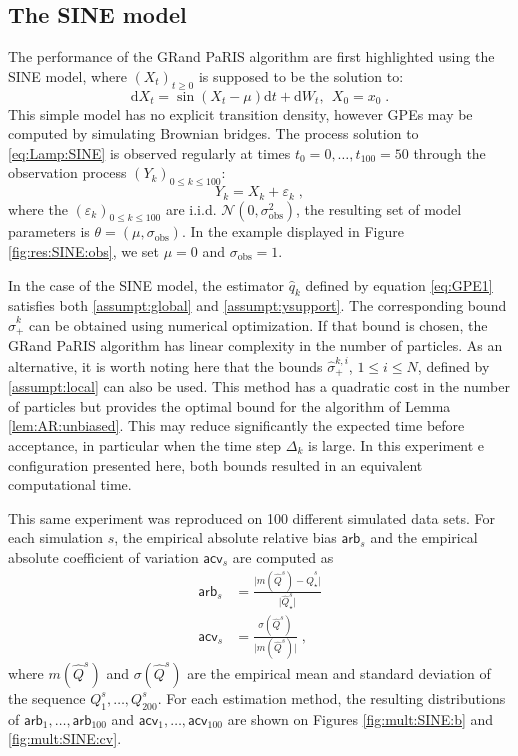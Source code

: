 \documentclass[12pt]{article}
\newcommand{\rmd}{\mathrm{d}}
\newcommand{\eqsp}{\;}
\newcommand{\1}{\mathrm{1}}
\newcommand{\hQ}{\widehat{Q}}
\begin{document}
\subsection*{The SINE model} 
The performance of the GRand PaRIS algorithm are first highlighted using the SINE model, where $(X_t)_{t\geq 0}$ is supposed to be the solution to: 
\begin{equation}
\rmd X_t = \sin \left(X_t-\mu\right)\rmd t + \rmd W_t,~~X_0=x_0\eqsp. \label{eq:Lamp:SINE}
\end{equation}
This simple model has no explicit transition density, however GPEs may be computed by simulating Brownian bridges.
The process solution to \eqref{eq:Lamp:SINE} is observed regularly at times $t_0=0,\ldots,t_{100}=50$ through the observation process $(Y_k)_{0\leq k \leq 100}$:
\begin{equation*}
Y_k = X_k + \varepsilon_k\eqsp,
\end{equation*}
where the $(\varepsilon_k)_{0\leq k \leq 100}$ are i.i.d. $\mathcal{N}(0, \sigma^2_\text{obs})$, the resulting set of model parameters is $\theta = (\mu, \sigma_\text{obs})$.
In the example displayed in Figure \ref{fig:res:SINE:obs}, we set $\mu=0$ and $ \sigma_\text{obs} = 1$.


In the case of the SINE model, the estimator $\widehat{q}_k$ defined by equation \eqref{eq:GPE1} satisfies both \eqref{assumpt:global} and \eqref{assumpt:ysupport}. The corresponding bound $\widehat{\sigma}_+^k$ can be obtained using numerical optimization. 
If that bound is chosen, the GRand PaRIS algorithm has linear complexity in the number of particles. 
As an alternative, it is worth noting here that the bounds $\widehat{\sigma}_+^{k,i}$, $1\le i \le N$, defined by \eqref{assumpt:local} can also be used. This method has a quadratic cost in the number of particles but provides the optimal bound for the algorithm of Lemma \ref{lem:AR:unbiased}. This may reduce significantly the expected time before acceptance, in particular when the time step $\Delta_k$ is large. In this experiment e configuration presented here, both bounds resulted in an equivalent computational time.

This same experiment was reproduced on 100 different simulated data sets. 
For each simulation $s$, the empirical absolute relative bias $\mathsf{arb}_s$ and the empirical absolute coefficient of variation $\mathsf{acv}_s$ are computed as
\begin{align*}
\mathsf{arb}_s &= \frac{\vert m(\hQ^s)-\hQ^s_\star\vert }{\vert \hQ^s_\star\vert }\\
\mathsf{acv}_s&=\frac{\sigma(\hQ^s)}{\vert m(\hQ^s)\vert }\eqsp,
\end{align*}
where $m(\hQ^s)$ and $\sigma(\hQ^s)$ are the empirical mean and standard deviation of the sequence $Q_1^s,\dots,Q_{200}^s$. For each estimation method, the resulting distributions of $\mathsf{arb}_1,\dots,\mathsf{arb}_{100}$ and $\mathsf{acv}_1,\dots,\mathsf{acv}_{100}$  are shown on Figures \ref{fig:mult:SINE:b} and  \ref{fig:mult:SINE:cv}.
\end{document}
